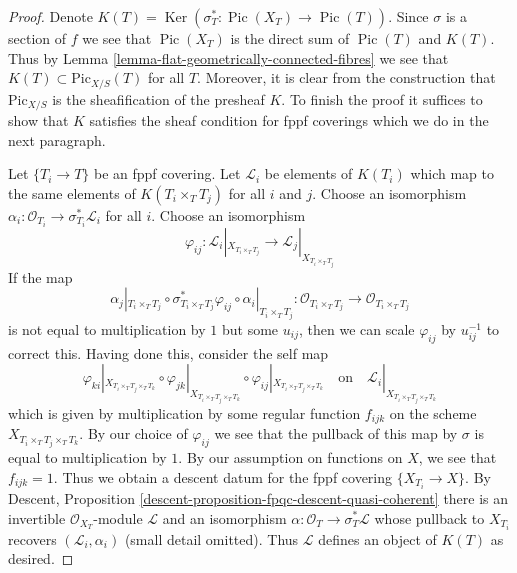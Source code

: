 \documentclass[10pt,a4paper]{amsart}
\theoremstyle{plain}
\theoremstyle{definition}
\theoremstyle{remark}
\numberwithin{equation}{subsection}
\def\Ker{\mathop{\mathrm{Ker}}}
\def\Pic{\mathop{\mathrm{Pic}}\nolimits}
\def\Picardfunctor{\mathrm{Pic}}
\begin{document}
\begin{proof}
Denote $K(T) = \Ker(\sigma_T^* : \Pic(X_T) \to \Pic(T))$.
Since $\sigma$ is a section of $f$ we see that $\Pic(X_T)$ is the direct
sum of $\Pic(T)$ and $K(T)$.
Thus by Lemma \ref{lemma-flat-geometrically-connected-fibres} we see that
$K(T) \subset \Picardfunctor_{X/S}(T)$ for all $T$. Moreover, it is clear
from the construction that $\Picardfunctor_{X/S}$ is the sheafification
of the presheaf $K$. To finish the proof it suffices to show that
$K$ satisfies the sheaf condition for fppf coverings which we do
in the next paragraph.

\medskip\noindent
Let $\{T_i \to T\}$ be an fppf covering. Let $\mathcal{L}_i$ be
elements of $K(T_i)$ which map to the same elements of $K(T_i \times_T T_j)$
for all $i$ and $j$. Choose an isomorphism
$\alpha_i : \mathcal{O}_{T_i} \to \sigma_{T_i}^*\mathcal{L}_i$
for all $i$. Choose an isomorphism
$$
\varphi_{ij} :
\mathcal{L}_i|_{X_{T_i \times_T T_j}}
\longrightarrow
\mathcal{L}_j|_{X_{T_i \times_T T_j}}
$$
If the map
$$
\alpha_j|_{T_i \times_T T_j} \circ
\sigma_{T_i \times_T T_j}^*\varphi_{ij} \circ
\alpha_i|_{T_i \times_T T_j} :
\mathcal{O}_{T_i \times_T T_j} \to \mathcal{O}_{T_i \times_T T_j}
$$
is not equal to multiplication by $1$ but some $u_{ij}$, then we can scale
$\varphi_{ij}$ by $u_{ij}^{-1}$ to correct this. Having done this, consider
the self map
$$
\varphi_{ki}|_{X_{T_i \times_T T_j \times_T T_k}} \circ
\varphi_{jk}|_{X_{T_i \times_T T_j \times_T T_k}} \circ
\varphi_{ij}|_{X_{T_i \times_T T_j \times_T T_k}}
\quad\text{on}\quad
\mathcal{L}_i|_{X_{T_i \times_T T_j \times_T T_k}}
$$
which is given by multiplication by some regular function $f_{ijk}$
on the scheme $X_{T_i \times_T T_j \times_T T_k}$.
By our choice of $\varphi_{ij}$ we see that the pullback of
this map by $\sigma$ is equal to multiplication by $1$. By
our assumption on functions on $X$, we see that $f_{ijk} = 1$.
Thus we obtain a descent datum for the fppf covering
$\{X_{T_i} \to X\}$. By
Descent, Proposition \ref{descent-proposition-fpqc-descent-quasi-coherent}
there is an invertible $\mathcal{O}_{X_T}$-module $\mathcal{L}$
and an isomorphism $\alpha : \mathcal{O}_T \to \sigma_T^*\mathcal{L}$
whose pullback to $X_{T_i}$ recovers $(\mathcal{L}_i, \alpha_i)$
(small detail omitted). Thus $\mathcal{L}$ defines an object
of $K(T)$ as desired.
\end{proof}
\end{document}

